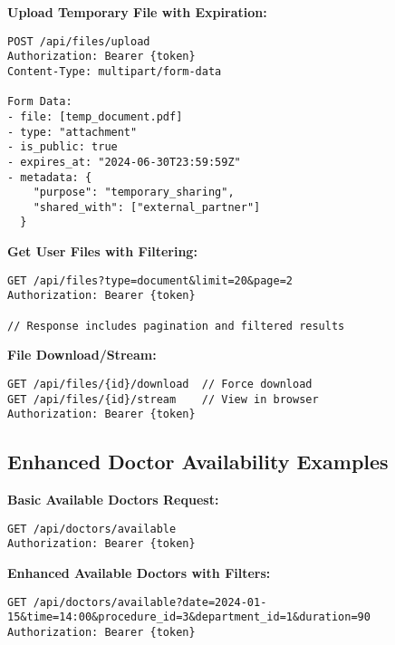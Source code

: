 \documentclass[12pt,a4paper]{article}
\begin{document}
\textbf{Upload Temporary File with Expiration:}
\begin{lstlisting}
POST /api/files/upload
Authorization: Bearer {token}
Content-Type: multipart/form-data

Form Data:
- file: [temp_document.pdf]
- type: "attachment"
- is_public: true
- expires_at: "2024-06-30T23:59:59Z"
- metadata: {
    "purpose": "temporary_sharing",
    "shared_with": ["external_partner"]
  }
\end{lstlisting}

\textbf{Get User Files with Filtering:}
\begin{lstlisting}
GET /api/files?type=document&limit=20&page=2
Authorization: Bearer {token}

// Response includes pagination and filtered results
\end{lstlisting}

\textbf{File Download/Stream:}
\begin{lstlisting}
GET /api/files/{id}/download  // Force download
GET /api/files/{id}/stream    // View in browser
Authorization: Bearer {token}
\end{lstlisting}

\subsection{Enhanced Doctor Availability Examples}

\textbf{Basic Available Doctors Request:}
\begin{lstlisting}
GET /api/doctors/available
Authorization: Bearer {token}
\end{lstlisting}

\textbf{Enhanced Available Doctors with Filters:}
\begin{lstlisting}
GET /api/doctors/available?date=2024-01-15&time=14:00&procedure_id=3&department_id=1&duration=90
Authorization: Bearer {token}
\end{lstlisting}
\end{document}

